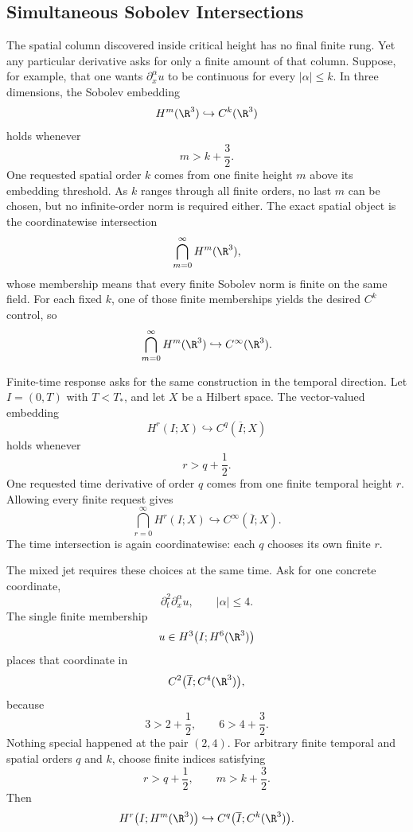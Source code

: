 
\subsection{Simultaneous Sobolev Intersections}\label{sub:SimultaneousSobolevIntersections}

The spatial column discovered inside critical height has no final finite rung.
Yet any particular derivative asks for only a finite amount of that column.
Suppose, for example, that one wants \(\partial_x^\alpha u\) to be continuous for every \(\lvert\alpha\rvert\le k\).
In three dimensions, the Sobolev embedding
\[
  H^m(\R^3)
  \hookrightarrow
  C^k(\R^3)
\]
holds whenever
\[
  m>k+\frac32.
\]
One requested spatial order \(k\) comes from one finite height \(m\) above its embedding threshold.
As \(k\) ranges through all finite orders, no last \(m\) can be chosen, but no infinite-order norm is required either.
The exact spatial object is the coordinatewise intersection
\[
  \bigcap_{m=0}^{\infty}H^m(\R^3),
\]
whose membership means that every finite Sobolev norm is finite on the same field.
For each fixed \(k\), one of those finite memberships yields the desired \(C^k\) control, so
\[
  \bigcap_{m=0}^{\infty}H^m(\R^3)
  \hookrightarrow
  C^\infty(\R^3).
\]

Finite-time response asks for the same construction in the temporal direction.
Let \(I=(0,T)\) with \(T<T_*\), and let \(X\) be a Hilbert space.
The vector-valued embedding
\[
  H^r(I;X)
  \hookrightarrow
  C^q(\overline I;X)
\]
holds whenever
\[
  r>q+\frac12.
\]
One requested time derivative of order \(q\) comes from one finite temporal height \(r\).
Allowing every finite request gives
\[
  \bigcap_{r=0}^{\infty}H^r(I;X)
  \hookrightarrow
  C^\infty(\overline I;X).
\]
The time intersection is again coordinatewise: each \(q\) chooses its own finite \(r\).

The mixed jet requires these choices at the same time.
Ask for one concrete coordinate,
\[
  \partial_t^2\partial_x^\alpha u,
  \qquad
  \lvert\alpha\rvert\le4.
\]
The single finite membership
\[
  u\in H^3\bigl(I;H^6(\R^3)\bigr)
\]
places that coordinate in
\[
  C^2\bigl(\overline I;C^4(\R^3)\bigr),
\]
because
\[
  3>2+\frac12,
  \qquad
  6>4+\frac32.
\]
Nothing special happened at the pair \((2,4)\).
For arbitrary finite temporal and spatial orders \(q\) and \(k\), choose finite indices satisfying
\[
  r>q+\frac12,
  \qquad
  m>k+\frac32.
\]
Then
\[
  H^r\bigl(I;H^m(\R^3)\bigr)
  \hookrightarrow
  C^q\bigl(\overline I;C^k(\R^3)\bigr).
\]

